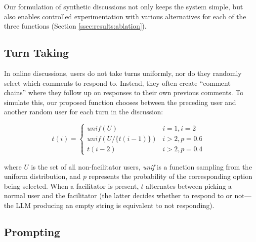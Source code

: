 Our formulation of synthetic discussions not only keeps the system simple, but also enables controlled experimentation with various alternatives for each of the three functions (Section \ref{ssec:results:ablation}).


\subsection{Turn Taking}
\label{ssec:experimental:turn}

In online discussions, users do not take turns uniformly, nor do they randomly select which comments to respond to. Instead, they often create ``comment chains'' where they follow up on responses to their own previous comments. To simulate this, our proposed function chooses between the preceding user and another random user for each turn in the discussion:

\small
\begin{equation}
\label{eq:turn_taking}
    t(i) = \left\{
\begin{array}{ll}
    \textit{unif}(U) & i=1, i=2\\
    \textit{unif}(U/\{t(i-1)\}) & i > 2, p=0.6 \\
    t(i-2) & i > 2, p=0.4 
\end{array} 
\right.
\end{equation}
\normalsize

\noindent where $U$ is the set of all non-facilitator users, \textit{unif} is a function sampling from the uniform distribution, and $p$ represents the probability of the corresponding option being selected. When a facilitator is present, $t$ alternates between picking a normal user and the facilitator (the latter decides whether to respond to or not---the \ac{LLM} producing an empty string is equivalent to not responding).


\subsection{Prompting}
\label{ssec:experimental:prompts}

